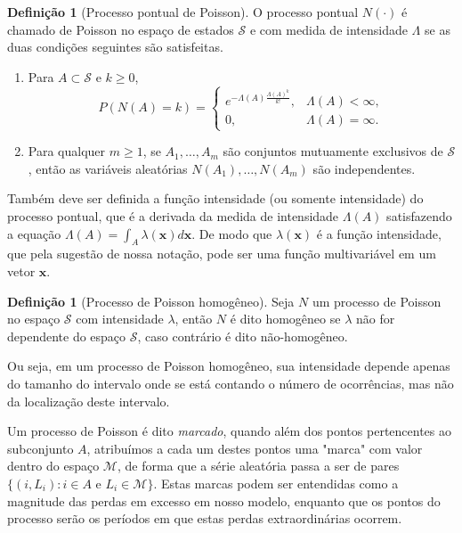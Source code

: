 \documentclass[review]{elsarticle}
\theoremstyle{definition}
\newtheorem{defi}[teor]{Definição}
\begin{document}
\begin{defi}[Processo pontual de Poisson]
	\label{defi:poissonpp}
	O processo pontual $N(\cdot)$ é chamado de Poisson no espaço de estados $\mathcal{S}$ e com medida de intensidade $\Lambda$ se as duas condições seguintes são satisfeitas.
\end{defi}
\begin{enumerate}[label=(\alph*)]
	\item Para $A\subset\mathcal{S}$ e $k\geq 0$,
	\begin{equation*}
	P\left(N(A)=k\right)=
	\begin{cases}
	e^{-\Lambda(A)\frac{\Lambda(A)^k}{k!}}, &\Lambda(A)<\infty, \\
	0, &\Lambda(A)=\infty .
	\end{cases}
	\end{equation*}
	\item Para qualquer $m\geq 1$, se $A_1, \ldots , A_m$ são conjuntos mutuamente exclusivos de $\mathcal{S}$, então as variáveis aleatórias $N(A_1), \ldots , N(A_m)$ são independentes.
\end{enumerate}

Também deve ser definida a função intensidade (ou somente intensidade) do processo pontual, que é a derivada da medida de intensidade $\Lambda(A)$ satisfazendo a equação $\Lambda(A)=\int_A\lambda(\mathbf{x}) d\mathbf{x}$. De modo que $\lambda(\mathbf{x})$ é a função intensidade, que pela sugestão de nossa notação, pode ser uma função multivariável em um vetor $\mathbf{x}$.

\begin{defi}[Processo de Poisson homogêneo]
	\label{defi:poihomo}
	Seja $N$ um processo de Poisson no espaço $\mathcal{S}$ com intensidade $\lambda$, então $N$ é dito homogêneo se $\lambda$ não for dependente do espaço $\mathcal{S}$, caso contrário é dito não-homogêneo.
\end{defi}

Ou seja, em um processo de Poisson homogêneo, sua intensidade depende apenas do tamanho do intervalo onde se está contando o número de ocorrências, mas não da localização deste intervalo. 

Um processo de Poisson é dito \emph{marcado}, quando além dos pontos pertencentes ao subconjunto $A$, atribuímos a cada um destes pontos uma "marca"  com valor dentro do espaço $\mathcal{M}$, de forma que a série aleatória passa a ser de pares $\{(i, L_i): i\in A \text{ e } L_i \in \mathcal{M}\}$. Estas marcas podem ser entendidas como a magnitude das perdas em excesso em nosso modelo, enquanto que os pontos do processo serão os períodos em que estas perdas extraordinárias ocorrem.
\end{document}
